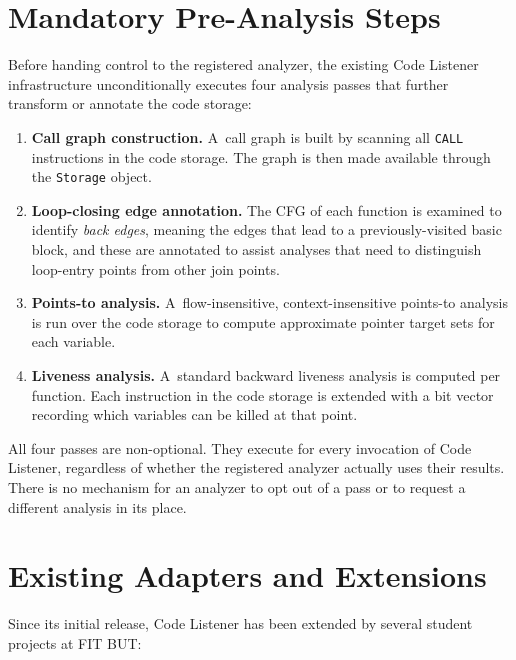 \section{Mandatory Pre-Analysis Steps}
\label{sec:mandatory-analyses}

Before handing control to the registered analyzer, the existing Code Listener infrastructure unconditionally executes four analysis passes that further transform or annotate the code storage:

\begin{enumerate}
  \item \textbf{Call graph construction.} A~call graph is built by scanning all \texttt{CALL} instructions in the code storage. The graph is then made available through the \texttt{Storage} object.
  \item \textbf{Loop-closing edge annotation.} The CFG of each function is examined to identify \emph{back edges}, meaning the edges that lead to a previously-visited basic block, and these are annotated to assist analyses that need to distinguish loop-entry points from other join points.
  \item \textbf{Points-to analysis.} A~flow-insensitive, context-insensitive points-to analysis is run over the code storage to compute approximate pointer target sets for each variable.
  \item \textbf{Liveness analysis.} A~standard backward liveness analysis is computed per function. Each instruction in the code storage is extended with a bit vector recording which variables can be killed at that point.
\end{enumerate}

All four passes are non-optional. They execute for every invocation of Code Listener, regardless of whether the registered analyzer actually uses their results. There is no mechanism for an analyzer to opt out of a pass or to request a different analysis in its place.

\section{Existing Adapters and Extensions}

Since its initial release, Code Listener has been extended by several student projects at FIT BUT:

